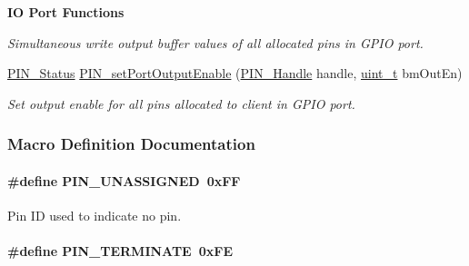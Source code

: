 \begin{Indent}{\bf I\+O Port Functions}
\begin{DoxyCompactItemize}
\begin{DoxyCompactList}\small\item\em Simultaneous write output buffer values of all allocated pins in G\+P\+I\+O port. \end{DoxyCompactList}\item 
\hyperlink{_p_i_n_8h_abe0ad59bbf09e51fe37195a5e70b23f6}{P\+I\+N\+\_\+\+Status} \hyperlink{_p_i_n_8h_a597fe2039644ee0389980d0a729de4e7}{P\+I\+N\+\_\+set\+Port\+Output\+Enable} (\hyperlink{_p_i_n_8h_afb2de52b054638f63c39df1f30a0d88d}{P\+I\+N\+\_\+\+Handle} handle, \hyperlink{_p_i_n_8h_a12a1e9b3ce141648783a82445d02b58d}{uint\+\_\+t} bm\+Out\+En)
\begin{DoxyCompactList}\small\item\em Set output enable for all pins allocated to client in G\+P\+I\+O port. \end{DoxyCompactList}\end{DoxyCompactItemize}
\end{Indent}


\subsubsection{Macro Definition Documentation}
\paragraph[{P\+I\+N\+\_\+\+U\+N\+A\+S\+S\+I\+G\+N\+E\+D}]{\setlength{\rightskip}{0pt plus 5cm}\#define P\+I\+N\+\_\+\+U\+N\+A\+S\+S\+I\+G\+N\+E\+D~0x\+F\+F}\label{_p_i_n_8h_aba219226dfdc9ea2fb82d6a7995395bf}


Pin I\+D used to indicate no pin. 

\paragraph[{P\+I\+N\+\_\+\+T\+E\+R\+M\+I\+N\+A\+T\+E}]{\setlength{\rightskip}{0pt plus 5cm}\#define P\+I\+N\+\_\+\+T\+E\+R\+M\+I\+N\+A\+T\+E~0x\+F\+E}\label{_p_i_n_8h_ae22ec44ad92ee130a665ca56aad38c75}


